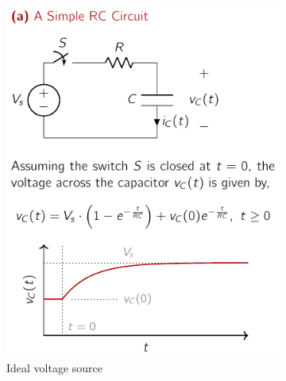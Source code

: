 \begin{figure}[t]
    \centering
    \begin{subfigure}{0.48\textwidth}
        \centering
        \includegraphics[width=\textwidth]{figure/ch02/fig02-07a.pdf}
        \caption{Ideal voltage source}
        \label{fig:02-07a}
    \end{subfigure}
    \hfill
    \begin{subfigure}{0.48\textwidth}
        \centering

\end{subfigure}
\end{figure}
